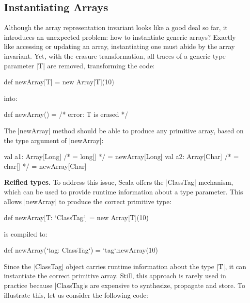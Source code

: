 \subsection{Instantiating Arrays}

Although the array representation invariant looks like a good deal so far, it introduces an unexpected problem: how to instantiate generic arrays? Exactly like accessing or updating an array, instantiating one must abide by the array invariant. Yet, with the erasure transformation, all traces of a generic type parameter |T| are removed, transforming the code:

\begin{lstlisting-nobreak}
 def newArray[T] = new Array[T](10)
\end{lstlisting-nobreak}

\noindent
into:

\begin{lstlisting-nobreak}
 def newArray() = /* error: T is erased */
\end{lstlisting-nobreak}

The |newArray| method should be able to produce any primitive array, based on the type argument of |newArray|:

\begin{lstlisting-nobreak}
 val a1: Array[Long] /* = long[] */ = newArray[Long]
 val a2: Array[Char] /* = char[] */ = newArray[Char]
\end{lstlisting-nobreak}

\textbf{Reified types.} To address this issue, Scala offers the |ClassTag| mechanism, which can be used to provide runtime information about a type parameter. This allows |newArray| to produce the correct primitive type:

\begin{lstlisting-nobreak}
 def newArray[T: `ClassTag`] = new Array[T](10)
\end{lstlisting-nobreak}

\noindent
is compiled to:

\begin{lstlisting-nobreak}
 def newArray(`tag: ClassTag`) = `tag`.newArray(10)
\end{lstlisting-nobreak}

Since the |ClassTag| object carries runtime information about the type |T|, it can instantiate the correct primitive array. Still, this approach is rarely used in practice because |ClassTag|s are expensive to synthesize, propagate and store.
To illustrate this, let us consider the following code:

